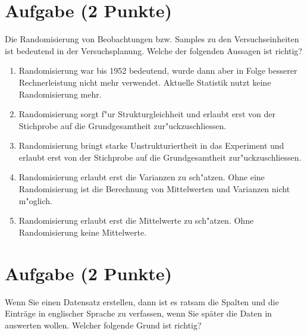 \documentclass[a4paper, 10pt]{scrartcl}\usepackage[]{graphicx}\usepackage[]{color}
\begin{document}
\section{Aufgabe \hfill (2 Punkte)}

Die Randomisierung von Beobachtungen bzw. Samples zu den Versuchseinheiten
ist bedeutend in der Versuchsplanung. Welche der folgenden Aussagen ist richtig?



\begin{enumerate}
\item [\textbf{A} \msquare] Randomisierung war bis 1952 bedeutend, wurde dann aber in Folge besserer Rechnerleistung nicht mehr verwendet. Aktuelle Statistik nutzt keine Randomisierung mehr.
\item [\textbf{B} \msquare] Randomisierung sorgt f{"u}r Strukturgleichheit und erlaubt erst von der Stichprobe auf die Grundgesamtheit zur{"u}ckzuschliessen.
\item [\textbf{C} \msquare] Randomisierung bringt starke Unstrukturiertheit in das Experiment und erlaubt erst von der Stichprobe auf die Grundgesamtheit zur{"u}ckzuschliessen.
\item [\textbf{D} \msquare] Randomisierung erlaubt erst die Varianzen zu sch{"a}tzen. Ohne eine Randomisierung ist die Berechnung von Mittelwerten und Varianzen nicht m{"o}glich.
\item [\textbf{E} \msquare] Randomisierung erlaubt erst die Mittelwerte zu sch{"a}tzen. Ohne Randomisierung keine Mittelwerte.
\end{enumerate}

\section{Aufgabe \hfill (2 Punkte)}

Wenn Sie einen Datensatz erstellen, dann ist es ratsam die Spalten und die
Eintr{\"a}ge in englischer Sprache zu verfassen, wenn Sie sp{\"a}ter die Daten in
\Rlogo auswerten wollen. Welcher folgende Grund ist richtig?
\end{document}
